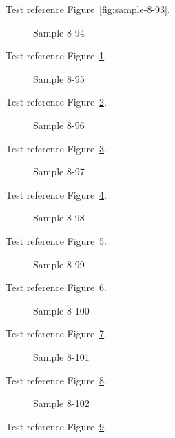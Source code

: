 Test reference Figure~\ref{fig:sample-8-93}.

\begin{figure}[tbhp]
\caption{Sample 8-94}
\label{fig:sample-8-94}
\end{figure}

Test reference Figure~\ref{fig:sample-8-94}.

\begin{figure}[tbhp]
\caption{Sample 8-95}
\label{fig:sample-8-95}
\end{figure}

Test reference Figure~\ref{fig:sample-8-95}.

\begin{figure}[tbhp]
\caption{Sample 8-96}
\label{fig:sample-8-96}
\end{figure}

Test reference Figure~\ref{fig:sample-8-96}.

\begin{figure}[tbhp]
\caption{Sample 8-97}
\label{fig:sample-8-97}
\end{figure}

Test reference Figure~\ref{fig:sample-8-97}.

\begin{figure}[tbhp]
\caption{Sample 8-98}
\label{fig:sample-8-98}
\end{figure}

Test reference Figure~\ref{fig:sample-8-98}.

\begin{figure}[tbhp]
\caption{Sample 8-99}
\label{fig:sample-8-99}
\end{figure}

Test reference Figure~\ref{fig:sample-8-99}.

\begin{figure}[tbhp]
\caption{Sample 8-100}
\label{fig:sample-8-100}
\end{figure}

Test reference Figure~\ref{fig:sample-8-100}.

\begin{figure}[tbhp]
\caption{Sample 8-101}
\label{fig:sample-8-101}
\end{figure}

Test reference Figure~\ref{fig:sample-8-101}.

\begin{figure}[tbhp]
\caption{Sample 8-102}
\label{fig:sample-8-102}
\end{figure}

Test reference Figure~\ref{fig:sample-8-102}.

